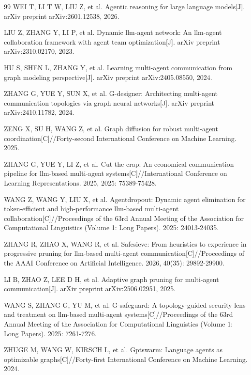 \begin{thebibliography}{99}
WEI T, LI T W, LIU Z, et al. Agentic reasoning for large language models[J]. arXiv preprint arXiv:2601.12538, 2026.

LIU Z, ZHANG Y, LI P, et al. Dynamic llm-agent network: An llm-agent collaboration framework with agent team optimization[J]. arXiv preprint arXiv:2310.02170, 2023.

HU S, SHEN L, ZHANG Y, et al. Learning multi-agent communication from graph modeling perspective[J]. arXiv preprint arXiv:2405.08550, 2024.

ZHANG G, YUE Y, SUN X, et al. G-designer: Architecting multi-agent communication topologies via graph neural networks[J]. arXiv preprint arXiv:2410.11782, 2024.

ZENG X, SU H, WANG Z, et al. Graph diffusion for robust multi-agent coordination[C]//Forty-second International Conference on Machine Learning. 2025.

ZHANG G, YUE Y, LI Z, et al. Cut the crap: An economical communication pipeline for llm-based multi-agent systems[C]//International Conference on Learning Representations. 2025, 2025: 75389-75428.

WANG Z, WANG Y, LIU X, et al. Agentdropout: Dynamic agent elimination for token-efficient and high-performance llm-based multi-agent collaboration[C]//Proceedings of the 63rd Annual Meeting of the Association for Computational Linguistics (Volume 1: Long Papers). 2025: 24013-24035.

ZHANG R, ZHAO X, WANG R, et al. Safesieve: From heuristics to experience in progressive pruning for llm-based multi-agent communication[C]//Proceedings of the AAAI Conference on Artificial Intelligence. 2026, 40(35): 29892-29900.

LI B, ZHAO Z, LEE D H, et al. Adaptive graph pruning for multi-agent communication[J]. arXiv preprint arXiv:2506.02951, 2025.

WANG S, ZHANG G, YU M, et al. G-safeguard: A topology-guided security lens and treatment on llm-based multi-agent systems[C]//Proceedings of the 63rd Annual Meeting of the Association for Computational Linguistics (Volume 1: Long Papers). 2025: 7261-7276.

ZHUGE M, WANG W, KIRSCH L, et al. Gptswarm: Language agents as optimizable graphs[C]//Forty-first International Conference on Machine Learning. 2024.


\end{thebibliography}
